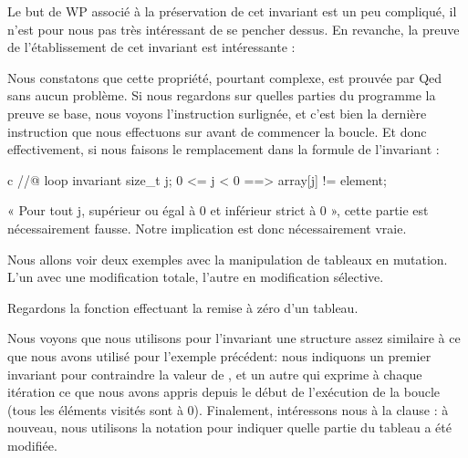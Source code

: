 Le but de WP associé à la préservation de cet invariant est un peu compliqué, il
n'est pour nous pas très intéressant de se pencher dessus. En revanche, la 
preuve de l'établissement de cet invariant est intéressante :





Nous constatons que cette propriété, pourtant complexe, est prouvée par 
Qed sans aucun problème. Si nous regardons sur quelles parties du programme la 
preuve se base, nous voyons l'instruction  surlignée, et c'est 
bien la dernière instruction que nous effectuons sur  avant de commencer
la boucle. Et donc effectivement, si nous faisons le remplacement dans la formule 
de l'invariant :



\begin{CodeBlock}{c}
//@ loop invariant \forall size_t j; 0 <= j < 0 ==> array[j] != element;
\end{CodeBlock}



« Pour tout j, supérieur ou égal à 0 et inférieur strict à 0 », cette partie est
nécessairement fausse. Notre implication est donc nécessairement vraie.





Nous allons voir deux exemples avec la manipulation de tableaux en mutation. 
L'un avec une modification totale, l'autre en modification sélective.





Regardons la fonction effectuant la remise à zéro d'un tableau.






Nous voyons que nous utilisons pour l'invariant une structure assez similaire
à ce que nous avons utilisé pour l'exemple précédent: nous indiquons un premier
invariant pour contraindre la valeur de , et un autre qui exprime
à chaque itération ce que nous avons appris depuis le début de l'exécution de la
boucle (tous les éléments visités sont à $0$). Finalement, intéressons nous à la
clause : à nouveau, nous utilisons la notation 
 pour indiquer quelle partie du tableau a été modifiée.



